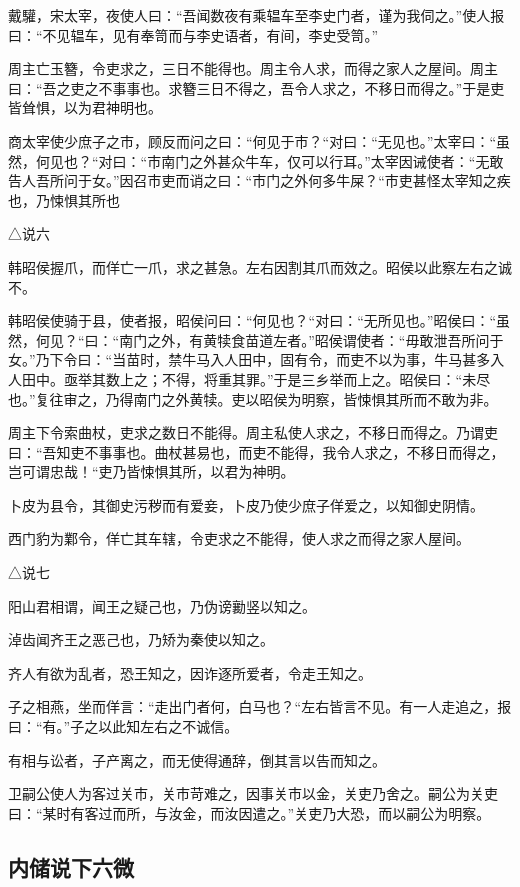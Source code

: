 \documentclass[]{article}
\begin{document}
戴驩，宋太宰，夜使人曰：``吾闻数夜有乘辒车至李史门者，谨为我伺之。''使人报曰：``不见辒车，见有奉笥而与李史语者，有间，李史受笥。''

周主亡玉簪，令吏求之，三日不能得也。周主令人求，而得之家人之屋间。周主曰：``吾之吏之不事事也。求簪三日不得之，吾令人求之，不移日而得之。''于是吏皆耸惧，以为君神明也。

商太宰使少庶子之市，顾反而问之曰：``何见于市？``对曰：``无见也。''太宰曰：``虽然，何见也？``对曰：``市南门之外甚众牛车，仅可以行耳。''太宰因诫使者：``无敢告人吾所问于女。''因召市吏而诮之曰：``市门之外何多牛屎？``市吏甚怪太宰知之疾也，乃悚惧其所也

△说六

韩昭侯握爪，而佯亡一爪，求之甚急。左右因割其爪而效之。昭侯以此察左右之诚不。

韩昭侯使骑于县，使者报，昭侯问曰：``何见也？``对曰：``无所见也。''昭侯曰：``虽然，何见？``曰：``南门之外，有黄犊食苗道左者。''昭侯谓使者：``毋敢泄吾所问于女。''乃下令曰：``当苗时，禁牛马入人田中，固有令，而吏不以为事，牛马甚多入人田中。亟举其数上之；不得，将重其罪。''于是三乡举而上之。昭侯曰：``未尽也。''复往审之，乃得南门之外黄犊。吏以昭侯为明察，皆悚惧其所而不敢为非。

周主下令索曲杖，吏求之数日不能得。周主私使人求之，不移日而得之。乃谓吏曰：``吾知吏不事事也。曲杖甚易也，而吏不能得，我令人求之，不移日而得之，岂可谓忠哉！``吏乃皆悚惧其所，以君为神明。

卜皮为县令，其御史污秽而有爱妾，卜皮乃使少庶子佯爱之，以知御史阴情。

西门豹为鄴令，佯亡其车辖，令吏求之不能得，使人求之而得之家人屋间。

△说七

阳山君相谓，闻王之疑己也，乃伪谤勷竖以知之。

淖齿闻齐王之恶己也，乃矫为秦使以知之。

齐人有欲为乱者，恐王知之，因诈逐所爱者，令走王知之。

子之相燕，坐而佯言：``走出门者何，白马也？``左右皆言不见。有一人走追之，报曰：``有。''子之以此知左右之不诚信。

有相与讼者，子产离之，而无使得通辞，倒其言以告而知之。

卫嗣公使人为客过关市，关市苛难之，因事关市以金，关吏乃舍之。嗣公为关吏曰：``某时有客过而所，与汝金，而汝因遣之。''关吏乃大恐，而以嗣公为明察。

\hypertarget{header-n1172}{%
\subsection{内储说下六微}\label{header-n1172}}
\end{document}
